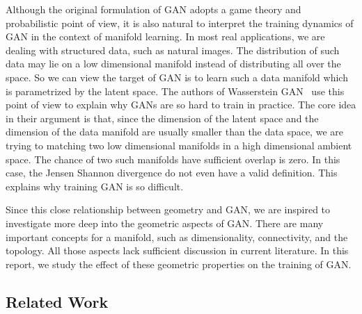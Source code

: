 Although the original formulation of GAN
adopts a game theory and probabilistic point of view,
it is also natural to interpret the training dynamics of GAN
in the context of manifold learning.
In most real applications,
we are dealing with structured data,
such as natural images.
The distribution of such data may lie on a low dimensional manifold
instead of distributing all over the space.
So we can view the target of GAN is to learn such a data manifold
which is parametrized by the latent space.
The authors of Wasserstein GAN~\cite{arjovsky2017towards,arjovsky2017wasserstein}
use this point of view to explain
why GANs are so hard to train in practice.
The core idea in their argument is that,
since the dimension of the latent space and the dimension of the data manifold
are usually smaller than the data space,
we are trying to matching two low dimensional manifolds in a high dimensional
ambient space.
The chance of two such manifolds have sufficient overlap is zero.
In this case,
the Jensen Shannon divergence do not even have a valid definition.
This explains why training GAN is so difficult.

Since this close relationship between geometry and GAN,
we are inspired to investigate more deep into the geometric aspects of GAN.
There are many important concepts for a manifold,
such as dimensionality,
connectivity,
and the topology.
All those aspects lack sufficient discussion in current literature.
In this report,
we study the effect of these geometric properties on the training of GAN.

\subsection{Related Work}
